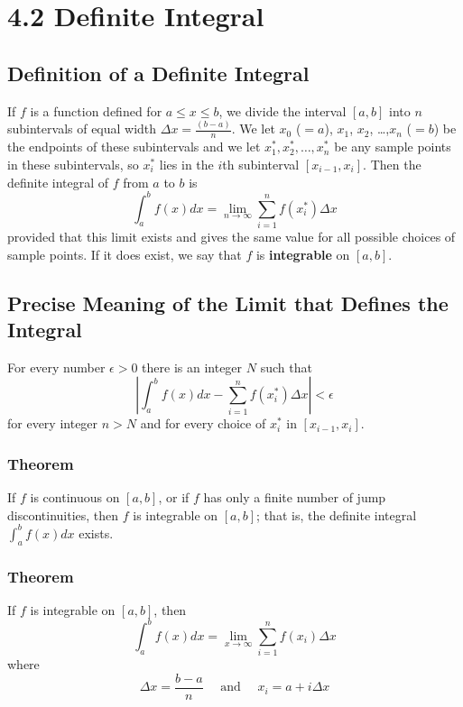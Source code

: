 %
%

\section*{4.2 Definite Integral}

\subsection*{Definition of a Definite Integral}

If \(f\) is a function defined for \(a \leq x \leq b\), we divide the interval \([a, b]\) into \(n\) subintervals of equal width \(\Delta x=\frac{(b-a)}{n}\). We let \(x_0\) (\(=a\)), \(x_1\), \(x_2\), \ldots,\(x_n\) (\(=b\)) be the endpoints of these subintervals and we let \(x_1^*, x_2^*, \ldots, x_n^*\) be any sample points in these subintervals, so \(x_i^*\) lies in the \(i\)th subinterval \([x_{i-1}, x_i]\). Then the definite integral of \(f\) from \(a\) to \(b\) is 
$$ \int_a^b f(x)dx=\lim_{n \to \infty} \sum_{i=1}^n f(x_i^*)\Delta x $$
provided that this limit exists and gives the same value for all possible choices of sample points. If it does exist, we say that \(f\) is \textbf{integrable} on \([a, b]\).

\subsection*{Precise Meaning of the Limit that Defines the Integral}

For every number \(\epsilon > 0\) there is an integer \(N\) such that
$$ \left|\int_a^b f(x)dx- \sum_{i=1}^n f(x_i^*)\Delta x\right|< \epsilon $$
for every integer \(n > N\) and for every choice of \(x_i^*\) in \([x_{i-1}, x_i]\).

\subsubsection*{Theorem}

If \(f\) is continuous on \([a, b]\), or if \(f\) has only a finite number of jump discontinuities, then \(f\) is integrable on \([a, b]\); that is, the definite integral \(\int_a^b f(x)dx\) exists.

\subsubsection*{Theorem}

If \(f\) is integrable on \([a, b]\), then
$$ \int_a^b f(x)dx=\lim_{x \to \infty} \sum_{i=1}^n f(x_i) \Delta x $$
where 
$$ \Delta x=\frac{b-a}{n} \quad \text{ and } \quad x_i=a+i \Delta x $$ 

